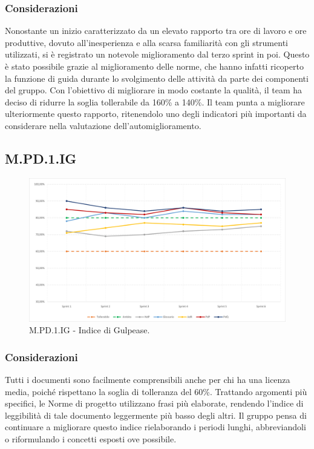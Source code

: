 \subsubsection{Considerazioni}
Nonostante un inizio caratterizzato da un elevato rapporto tra ore di lavoro e ore produttive, dovuto all'inesperienza e alla scarsa familiarità con gli strumenti utilizzati, si è registrato un notevole miglioramento dal terzo sprint in poi.
Questo è stato possibile grazie al miglioramento delle norme, che hanno infatti ricoperto la funzione di guida durante lo svolgimento delle attività da parte dei componenti del gruppo.
Con l'obiettivo di migliorare in modo costante la qualità, il team ha deciso di ridurre la soglia tollerabile da 160\% a 140\%.
Il team punta a migliorare ulteriormente questo rapporto, ritenendolo uno degli indicatori più importanti da considerare nella valutazione dell'automiglioramento.
\subsection{M.PD.1.IG}
\begin{figure}[H]
\includegraphics[width=15.5cm]{img/metriche/MPD1IG.png}
\caption{M.PD.1.IG - Indice di Gulpease.}
\end{figure}
\subsubsection{Considerazioni}
Tutti i documenti sono facilmente comprensibili anche per chi ha una licenza media, poiché rispettano la soglia di tolleranza del 60\%.
Trattando argomenti più specifici, le Norme di progetto utilizzano frasi più elaborate, rendendo l'indice di leggibilità di tale documento leggermente più basso degli altri.
Il gruppo pensa di continuare a migliorare questo indice rielaborando i periodi lunghi, abbreviandoli o riformulando i concetti esposti ove possibile.
